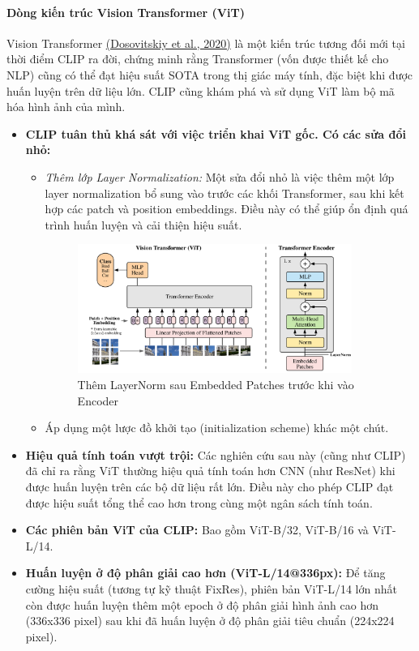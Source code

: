 \paragraph{Dòng kiến trúc Vision Transformer (ViT)}
Vision Transformer \hyperref[vit]{(Dosovitskiy et al., 2020)} là một kiến trúc tương đối mới tại thời điểm CLIP ra đời, chứng minh rằng Transformer (vốn được thiết kế cho NLP) cũng có thể đạt hiệu suất SOTA trong thị giác máy tính, đặc biệt khi được huấn luyện trên dữ liệu lớn. CLIP cũng khám phá và sử dụng ViT làm bộ mã hóa hình ảnh của mình.
\begin{itemize}
\item \textbf{CLIP tuân thủ khá sát với việc triển khai ViT gốc. Có các sửa đổi nhỏ:}
\begin{itemize}
\item \textit{Thêm lớp Layer Normalization:} Một sửa đổi nhỏ là việc thêm một lớp layer normalization bổ sung vào trước các khối Transformer, sau khi kết hợp các patch và position embeddings. Điều này có thể giúp ổn định quá trình huấn luyện và cải thiện hiệu suất.
    \begin{figure}[H]
    \centering
        \includegraphics[width=0.9\textwidth]{img/03-vit.png}
        \caption{Thêm LayerNorm sau Embedded Patches trước khi vào Encoder}
        \label{fig:global_avg}
    \end{figure}
\item Áp dụng một lược đồ khởi tạo (initialization scheme) khác một chút.
\end{itemize}
\item \textbf{Hiệu quả tính toán vượt trội:} Các nghiên cứu sau này (cũng như CLIP) đã chỉ ra rằng ViT thường hiệu quả tính toán hơn CNN (như ResNet) khi được huấn luyện trên các bộ dữ liệu rất lớn. Điều này cho phép CLIP đạt được hiệu suất tổng thể cao hơn trong cùng một ngân sách tính toán.
\item \textbf{Các phiên bản ViT của CLIP:} Bao gồm ViT-B/32, ViT-B/16 và ViT-L/14.
\item \textbf{Huấn luyện ở độ phân giải cao hơn (ViT-L/14@336px):} Để tăng cường hiệu suất (tương tự kỹ thuật FixRes), phiên bản ViT-L/14 lớn nhất còn được huấn luyện thêm một epoch ở độ phân giải hình ảnh cao hơn (336x336 pixel) sau khi đã huấn luyện ở độ phân giải tiêu chuẩn (224x224 pixel).
\end{itemize}

